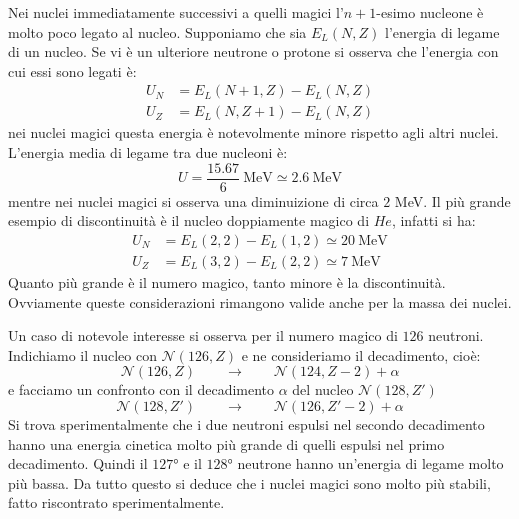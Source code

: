 Nei nuclei immediatamente successivi a quelli magici l'$n+1$-esimo nucleone è
molto poco legato al nucleo. Supponiamo che sia $E_L{(N, Z)}$ l'energia di
legame di un nucleo. Se vi è un ulteriore neutrone o protone si osserva che
l'energia con cui essi sono legati è:
\begin{equation}
\begin{split}
U_N &= E_L{(N + 1, Z)} - E_L{(N, Z)}\\
U_Z &= E_L{(N, Z + 1)} - E_L{(N, Z)}
\end{split}
\end{equation}
nei nuclei magici questa energia è notevolmente minore rispetto agli altri
nuclei. L'energia media di legame tra due nucleoni è:
\begin{equation}
U = \frac{15.67}{6}\ \text{MeV} \simeq 2.6\ \text{MeV}
\end{equation}
mentre nei nuclei magici si osserva una diminuizione di circa $2$ MeV. Il più
grande esempio di discontinuità è il nucleo doppiamente magico di $He$, 
infatti
si ha:
\begin{equation}
\begin{split}
U_N &= E_L{(2, 2)} - E_L{(1, 2)} \simeq 20\ \text{MeV}\\
U_Z &= E_L{(3, 2)} - E_L{(2,2)} \simeq 7\ \text{MeV}
\end{split}
\end{equation}
Quanto più grande è il numero magico, tanto minore è la discontinuità.
Ovviamente queste considerazioni rimangono valide anche per la massa dei nuclei.

Un caso di notevole interesse si osserva per il numero magico di $126$ neutroni.
Indichiamo il nucleo con $\mathcal{N}{(126, Z)}$ e ne consideriamo il
decadimento, cioè:
\begin{equation}
\mathcal{N}{(126, Z)} \qquad \rightarrow \qquad \mathcal{N}{(124, Z-2)} + \alpha
\end{equation}
e facciamo un confronto con il decadimento $\alpha$ del nucleo 
$\mathcal{N}{(128, Z')}$
\begin{equation}
\mathcal{N}{(128, Z')} \qquad \rightarrow \qquad \mathcal{N}{(126, Z'-2)} + 
\alpha
\end{equation}
Si trova sperimentalmente che i due neutroni espulsi nel secondo decadimento
hanno una energia cinetica molto più grande di quelli espulsi nel primo
decadimento. Quindi il $127$° e il $128$° neutrone hanno un'energia di legame
molto più bassa. Da tutto questo si deduce che i nuclei magici sono molto più
stabili, fatto riscontrato sperimentalmente.

